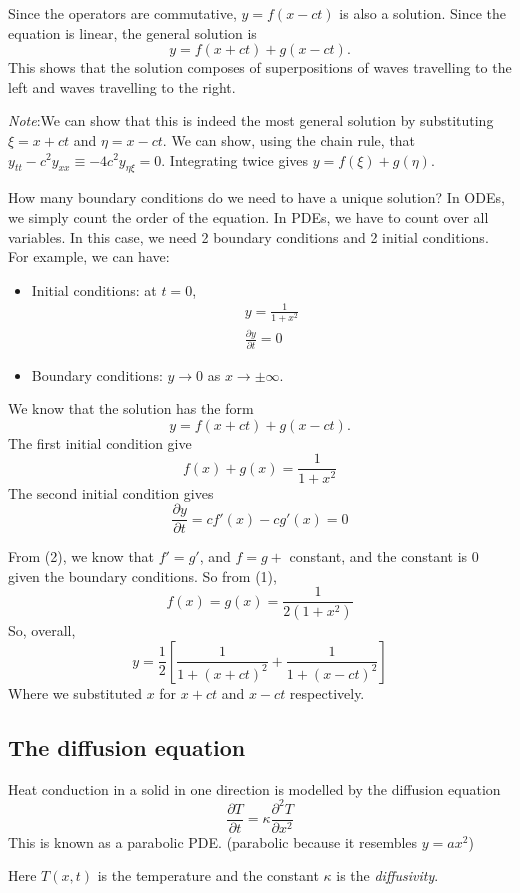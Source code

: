 \documentclass[a4paper]{article}
\theoremstyle{definition}
\newcommand{\note}{\noindent \emph{Note}:\;}
\begin{document}
Since the operators are commutative, $y = f(x - ct)$ is also a solution. Since the equation is linear, the general solution is
\[
y = f(x + ct) + g(x - ct).
\]
This shows that the solution composes of superpositions of waves travelling to the left and waves travelling to the right.

\note We can show that this is indeed the most general solution by substituting $\xi = x + ct$ and $\eta = x - ct$. We can show, using the chain rule, that $y_{tt} - c^2 y_{xx} \equiv -4c^2 y_{\eta\xi} = 0$. Integrating twice gives $y = f(\xi) + g(\eta)$.

How many boundary conditions do we need to have a unique solution? In ODEs, we simply count the order of the equation. In PDEs, we have to count over all variables. In this case, we need 2 boundary conditions and 2 initial conditions. For example, we can have:
\begin{itemize}
\item Initial conditions: at $t = 0$,
  \begin{gather*}
    y = \frac{1}{1 + x^2}\\
    \frac{\partial y}{\partial t} = 0
  \end{gather*}
\item Boundary conditions: $y \to 0$ as $x \to \pm \infty$.
\end{itemize}
We know that the solution has the form 
\[
y = f(x + ct) + g(x - ct).
\]
The first initial condition give
\[
f(x) + g(x) = \frac{1}{1 + x^2}\tag{1}
\]
The second initial condition gives
\[
\frac{\partial y}{\partial t} = cf'(x) - cg'(x)\tag{2} = 0
\]

From (2), we know that $f' = g'$, and $f = g + $ constant, and the constant is $0$ given the boundary conditions. So from (1),
\[
f(x) = g(x) = \frac{1}{2(1 + x^2)}
\]
So, overall,
\[
y = \frac{1}{2}\left[\frac{1}{1 + (x + ct)^2} + \frac{1}{1 + (x - ct)^2}\right]
\]
Where we substituted $x$ for $x +ct$ and $x - ct$ respectively.

\subsection{The diffusion equation}
Heat conduction in a solid in one direction is modelled by the diffusion equation
\[
\frac{\partial T}{\partial t} = \kappa \frac{\partial^2 T}{\partial x^2}
\]
This is known as a parabolic PDE. (parabolic because it resembles $y = ax^2$)

Here $T(x, t)$ is the temperature and the constant $\kappa$ is the \emph{diffusivity}.
\end{document}
